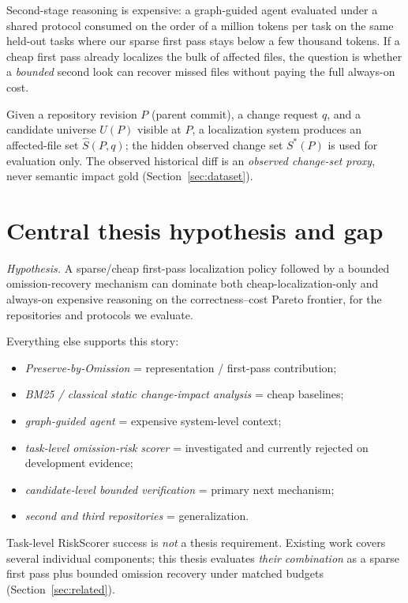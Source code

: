 \documentclass[11pt,a4paper]{article}
\begin{document}
Second-stage reasoning is expensive: a graph-guided agent evaluated under a
shared protocol consumed on the order of a million tokens per task on the same
held-out tasks where our sparse first pass stays below a few thousand tokens.
If a cheap first pass already localizes the bulk of affected files, the
question is whether a \emph{bounded} second look can recover missed files
without paying the full always-on cost.

Given a repository revision $P$ (parent commit), a change request $q$, and a
candidate universe $U(P)$ visible at $P$, a localization system produces an
affected-file set $\hat{S}(P,q)$; the hidden observed change set $S^*(P)$ is
used for evaluation only. The observed historical diff is an \emph{observed
change-set proxy}, never semantic impact gold (Section~\ref{sec:dataset}).

\section{Central thesis hypothesis and gap}
\label{sec:hypothesis}

\emph{Hypothesis.} A sparse/cheap first-pass localization policy followed by a
bounded omission-recovery mechanism can dominate both cheap-localization-only
and always-on expensive reasoning on the correctness--cost Pareto frontier, for
the repositories and protocols we evaluate.

Everything else supports this story:
\begin{itemize}
  \item \emph{Preserve-by-Omission} = representation / first-pass contribution;
  \item \emph{BM25 / classical static change-impact analysis} = cheap baselines;
  \item \emph{graph-guided agent} = expensive system-level context;
  \item \emph{task-level omission-risk scorer} = investigated and currently
        rejected on development evidence;
  \item \emph{candidate-level bounded verification} = primary next mechanism;
  \item \emph{second and third repositories} = generalization.
\end{itemize}

Task-level RiskScorer success is \emph{not} a thesis requirement. Existing work
covers several individual components; this thesis evaluates \emph{their
combination} as a sparse first pass plus bounded omission recovery under
matched budgets (Section~\ref{sec:related}).
\end{document}
